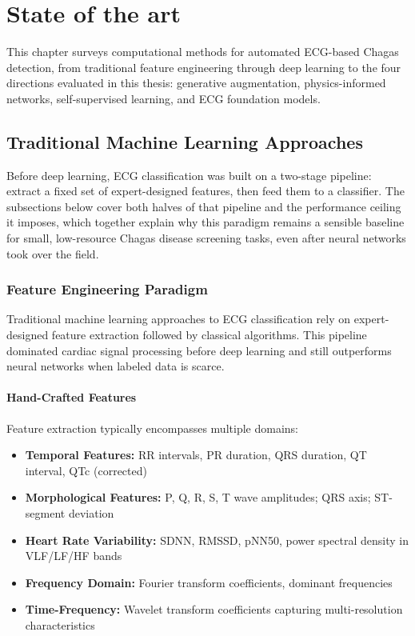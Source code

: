 \chapter{State of the art}
\label{chap:sota}

This chapter surveys computational methods for automated ECG-based Chagas detection, from traditional feature engineering through deep learning to the four directions evaluated in this thesis: generative augmentation, physics-informed networks, self-supervised learning, and ECG foundation models.

\section{Traditional Machine Learning Approaches}

Before deep learning, ECG classification was built on a two-stage pipeline: extract a fixed set of expert-designed features, then feed them to a classifier. The subsections below cover both halves of that pipeline and the performance ceiling it imposes, which together explain why this paradigm remains a sensible baseline for small, low-resource Chagas disease screening tasks, even after neural networks took over the field.

\subsection{Feature Engineering Paradigm}

Traditional machine learning approaches to ECG classification rely on expert-designed feature extraction followed by classical algorithms. This pipeline dominated cardiac signal processing before deep learning and still outperforms neural networks when labeled data is scarce.

\subsubsection{Hand-Crafted Features}

Feature extraction typically encompasses multiple domains:

\begin{itemize}
    \item \textbf{Temporal Features:} RR intervals, PR duration, QRS duration, QT interval, QTc (corrected)
    \item \textbf{Morphological Features:} P, Q, R, S, T wave amplitudes; QRS axis; ST-segment deviation
    \item \textbf{Heart Rate Variability:} SDNN, RMSSD, pNN50, power spectral density in VLF/LF/HF bands
    \item \textbf{Frequency Domain:} Fourier transform coefficients, dominant frequencies
    \item \textbf{Time-Frequency:} Wavelet transform coefficients capturing multi-resolution characteristics
\end{itemize}

